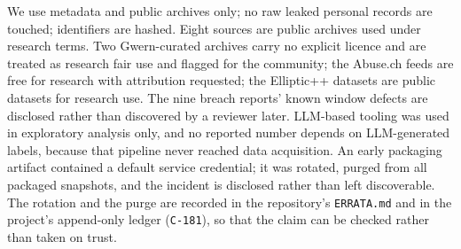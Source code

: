 \documentclass[11pt,a4paper]{article}
\begin{document}
We use metadata and public archives only; no raw leaked personal records are
touched; identifiers are hashed. Eight sources are public archives used under
research terms. Two Gwern-curated archives carry no explicit licence and are
treated as research fair use and flagged for the community; the Abuse.ch feeds
are free for research with attribution requested; the Elliptic++ datasets are
public datasets for research use. The nine breach reports' known window defects
are disclosed rather than discovered by a reviewer later. LLM-based tooling was
used in exploratory analysis only, and no reported number depends on
LLM-generated labels, because that pipeline never reached data acquisition. An
early packaging artifact contained a default service credential; it was rotated,
purged from all packaged snapshots, and the incident is disclosed rather than
left discoverable. The rotation and the purge are recorded in the repository's
\texttt{ERRATA.md} and in the project's append-only ledger (\texttt{C-181}), so
that the claim can be checked rather than taken on trust.
\end{document}
